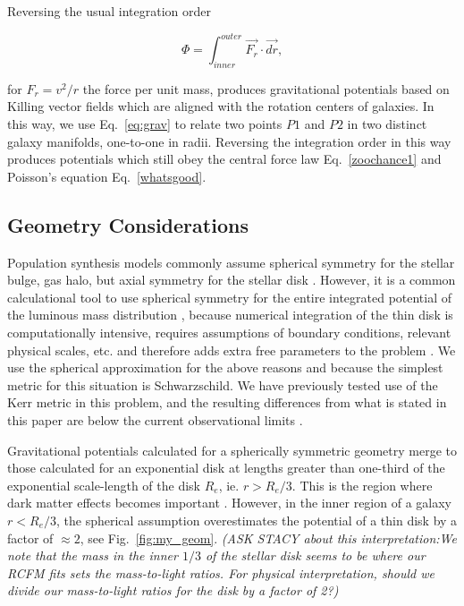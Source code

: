 \documentclass[reprint,%
 amsmath,amssymb,
 aps,
]{revtex4-1}
\begin{document}
 Reversing the usual integration order 
 
  \begin{equation}
     \Phi  =    \int_{inner}^{outer} \vec{F_r}\cdot\vec{dr}, 
      \label{eq:Newt2}
      \end{equation}
      
for $F_r = v^2/r$ the force per unit mass, produces gravitational 
potentials based on    Killing vector fields which are aligned with the rotation centers of galaxies. In this way, we use  Eq.~\ref{eq:grav}  to relate two points $P1$ and $P2$ in two
distinct galaxy manifolds, one-to-one in  radii.  
 Reversing the integration order    in this way produces potentials which still obey the central force law Eq.~\ref{zoochance1}   and Poisson's equation Eq.~\ref{whatsgood}.

 
\subsection{  Geometry Considerations  }\label{GeomSphere}
  
   Population synthesis models commonly assume spherical symmetry for the 
  stellar bulge, gas halo, but   axial symmetry for    the stellar disk \cite{1954AJ.....59..273S,Freeman}.
 However, it is a common calculational  tool to use spherical symmetry for the entire integrated potential of the luminous mass distribution  \cite{2022A&A...664A..40M,PhysRevD.70.083509}, because numerical integration of the thin disk is  computationally intensive,  requires assumptions of  boundary conditions,   relevant physical scales,  etc. and therefore adds extra free parameters to the problem \cite{2011A&A...531A..36H}.  
 We   use the spherical approximation   for the above reasons and because  the simplest metric for this situation is  
 Schwarzschild. We have previously tested use of the Kerr metric in this problem, and the resulting differences from what is stated in this paper are below the current observational limits \cite{Cisn}. 
 
Gravitational potentials calculated for  a spherically symmetric  geometry   
  merge to those calculated for an exponential disk  at lengths greater than one-third of the exponential scale-length of the disk $R_e$, ie.  $r> R_e/3$\cite{Chatterjee}. This is the region  where dark matter effects becomes important \cite{1985ApJAlbada}. 
However, 
    in the inner region of a galaxy $r< R_e/3$,  the spherical assumption   
    overestimates the potential of a thin disk by a factor of $\approx  2$, see Fig.~\ref{fig:my_geom}.  {\color{blue}\emph{(ASK STACY about this interpretation:We note that   the mass in the inner $1/3$ of the stellar disk seems to be where our RCFM fits   sets the mass-to-light ratios. For physical interpretation, should we divide our mass-to-light ratios for the disk by a factor of 2?)} } %
  
\end{document}
